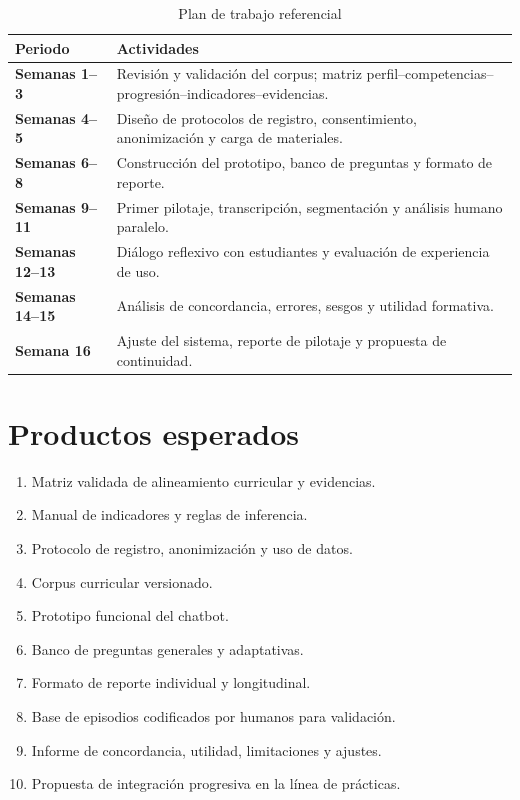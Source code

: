 \documentclass[11pt,a4paper]{article}
\begin{document}
\begin{table}[ht]
\centering
\caption{Plan de trabajo referencial}
\begin{tabularx}{\textwidth}{>{\bfseries}p{2.2cm}X}
\toprule
Periodo & Actividades\\
\midrule
Semanas 1--3 &
Revisión y validación del corpus; matriz perfil--competencias--progresión--indicadores--evidencias.\\
Semanas 4--5 &
Diseño de protocolos de registro, consentimiento, anonimización y carga de materiales.\\
Semanas 6--8 &
Construcción del prototipo, banco de preguntas y formato de reporte.\\
Semanas 9--11 &
Primer pilotaje, transcripción, segmentación y análisis humano paralelo.\\
Semanas 12--13 &
Diálogo reflexivo con estudiantes y evaluación de experiencia de uso.\\
Semanas 14--15 &
Análisis de concordancia, errores, sesgos y utilidad formativa.\\
Semana 16 &
Ajuste del sistema, reporte de pilotaje y propuesta de continuidad.\\
\bottomrule
\end{tabularx}
\end{table}

\section{Productos esperados}

\begin{enumerate}
    \item Matriz validada de alineamiento curricular y evidencias.
    \item Manual de indicadores y reglas de inferencia.
    \item Protocolo de registro, anonimización y uso de datos.
    \item Corpus curricular versionado.
    \item Prototipo funcional del chatbot.
    \item Banco de preguntas generales y adaptativas.
    \item Formato de reporte individual y longitudinal.
    \item Base de episodios codificados por humanos para validación.
    \item Informe de concordancia, utilidad, limitaciones y ajustes.
    \item Propuesta de integración progresiva en la línea de prácticas.
\end{enumerate}
\end{document}
